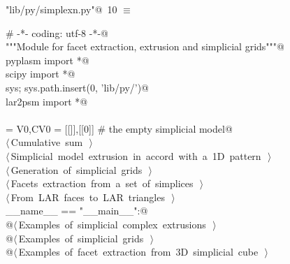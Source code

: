\documentclass[11pt,oneside]{article}	%
\begin{document}
\begin{flushleft} \small
\begin{minipage}{\linewidth} \label{scrap11}
\protect{}\verb@"lib/py/simplexn.py"@\nobreak\ {\footnotesize 10 }$\equiv$
\vspace{-1ex}
\begin{list}{}{} \item
\mbox{}\verb@# -*- coding: utf-8 -*-@\\
\mbox{}\verb@"""Module for facet extraction, extrusion and simplicial grids"""@\\
\mbox{}\verb@from pyplasm import *@\\
\mbox{}\verb@from scipy import *@\\
\mbox{}\verb@import sys; sys.path.insert(0, 'lib/py/')@\\
\mbox{}\verb@from lar2psm import *@\\
\mbox{}\verb@@\\
\mbox{}\verb@VOID = V0,CV0 = [[]],[[0]]    # the empty simplicial model@\\
\mbox{}\verb@@\hbox{$\langle\,$Cumulative sum\nobreak\ {\footnotesize {}}$\,\rangle$}\verb@@\\
\mbox{}\verb@@\hbox{$\langle\,$Simplicial model extrusion in accord with a 1D pattern\nobreak\ {\footnotesize {}}$\,\rangle$}\verb@@\\
\mbox{}\verb@@\hbox{$\langle\,$Generation of simplicial grids\nobreak\ {\footnotesize {}}$\,\rangle$}\verb@@\\
\mbox{}\verb@@\hbox{$\langle\,$Facets extraction from a set of simplices\nobreak\ {\footnotesize {}}$\,\rangle$}\verb@@\\
\mbox{}\verb@@\hbox{$\langle\,$From LAR faces to LAR triangles\nobreak\ {\footnotesize {}}$\,\rangle$}\verb@@\\
\mbox{}\verb@if __name__ == "__main__":@\\
\mbox{}\verb@   @\hbox{$\langle\,$Examples of simplicial complex extrusions\nobreak\ {\footnotesize {}}$\,\rangle$}\verb@@\\
\mbox{}\verb@   @\hbox{$\langle\,$Examples of simplicial grids\nobreak\ {\footnotesize {}}$\,\rangle$}\verb@@\\
\mbox{}\verb@   @\hbox{$\langle\,$Examples of facet extraction from 3D simplicial cube\nobreak\ {\footnotesize {}}$\,\rangle$}\verb@@\\
\mbox{}\verb@@{\NWsep}
\end{list}
\vspace{-2ex}
\end{minipage}\\[4ex]
\end{flushleft}
\end{document}
